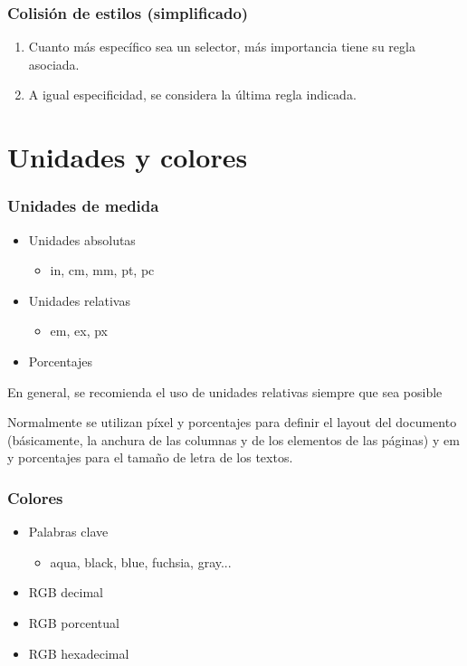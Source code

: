 
\begin{frame}
\frametitle{Colisión de estilos (simplificado)}

\begin{enumerate}
  \item Cuanto más específico sea un selector, más importancia tiene su regla asociada.
  \item A igual especificidad, se considera la última regla indicada.
\end{enumerate}

\end{frame}


\section{Unidades y colores}

\begin{frame}
\frametitle{Unidades de medida}

\begin{itemize}
  \item Unidades absolutas
  \begin{itemize}
    \item in, cm, mm, pt, pc
  \end{itemize}
  \item Unidades relativas
  \begin{itemize}
    \item em, ex, px
  \end{itemize}
  \item Porcentajes
\end{itemize}

En general, se recomienda el uso de unidades relativas siempre que sea posible

Normalmente se utilizan píxel y porcentajes para definir el layout del documento (básicamente, la anchura de las columnas y de los elementos de las páginas) y em y porcentajes para el tamaño de letra de los textos.

\end{frame}


\begin{frame}
\frametitle{Colores}

\begin{itemize}
  \item Palabras clave
  \begin{itemize}
    \item aqua, black, blue, fuchsia, gray...
  \end{itemize}
  \item RGB decimal
  \item RGB porcentual
  \item RGB hexadecimal
\end{itemize}

\end{frame}

